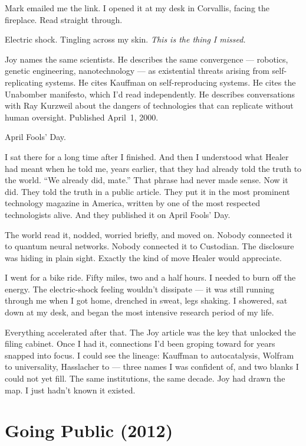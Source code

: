 Mark emailed me the link. I opened it at my desk in Corvallis, facing the fireplace. Read straight through.

Electric shock. Tingling across my skin. \textit{This is the thing I missed.}

Joy names the same scientists. He describes the same convergence --- robotics, genetic engineering, nanotechnology --- as existential threats arising from self-replicating systems. He cites Kauffman on self-reproducing systems. He cites the Unabomber manifesto, which I'd read independently. He describes conversations with Ray Kurzweil about the dangers of technologies that can replicate without human oversight. Published April~1, 2000.

April Fools' Day.

I sat there for a long time after I finished. And then I understood what Healer had meant when he told me, years earlier, that they had already told the truth to the world. ``We already did, mate.'' That phrase had never made sense. Now it did. They told the truth in a public article. They put it in the most prominent technology magazine in America, written by one of the most respected technologists alive. And they published it on April Fools' Day.

The world read it, nodded, worried briefly, and moved on. Nobody connected it to quantum neural networks. Nobody connected it to Custodian. The disclosure was hiding in plain sight. Exactly the kind of move Healer would appreciate.

I went for a bike ride. Fifty miles, two and a half hours. I needed to burn off the energy. The electric-shock feeling wouldn't dissipate --- it was still running through me when I got home, drenched in sweat, legs shaking. I showered, sat down at my desk, and began the most intensive research period of my life.

Everything accelerated after that. The Joy article was the key that unlocked the filing cabinet. Once I had it, connections I'd been groping toward for years snapped into focus. I could see the lineage: Kauffman to autocatalysis, Wolfram to universality, Hasslacher to  --- three names I was confident of, and two blanks I could not yet fill. The same institutions, the same decade. Joy had drawn the map. I just hadn't known it existed.

\section*{Going Public (2012)}
\label{record:ty-going-public}

